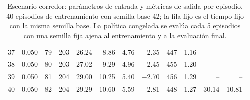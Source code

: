 \begin{table}[H]
\begin{tabular}{rrrrrrrrrrrr}
37 & 0.050 & 79 & 203 & 26.24 & 8.86 & 4.76 & $-$2.35 & 447 & 1.16 & -- & -- \\
38 & 0.050 & 80 & 203 & 27.02 & 9.29 & 4.96 & $-$2.45 & 455 & 1.20 & -- & -- \\
39 & 0.050 & 81 & 204 & 29.00 & 10.25 & 5.40 & $-$2.70 & 456 & 1.29 & -- & -- \\
40 & 0.050 & 82 & 204 & 29.29 & 10.60 & 5.59 & $-$2.81 & 448 & 1.27 & 30.14 & 10.81 \\
\bottomrule
\end{tabular}
\caption[Escenario corredor: episodios de entrenamiento]{Escenario corredor: parámetros de entrada y métricas de salida por episodio. 40 episodios de entrenamiento con semilla base 42; la fila fijo es el tiempo fijo con la misma semilla base. La política congelada se evalúa cada 5 episodios con una semilla fija ajena al entrenamiento y a la evaluación final.}
\label{tab:corredor-episodios}
\end{table}


